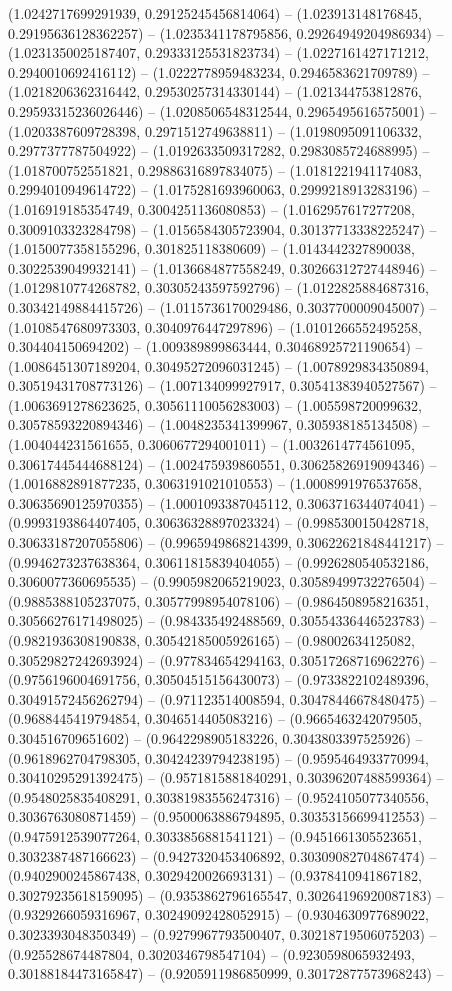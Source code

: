 (1.0242717699291939, 0.29125245456814064) -- (1.023913148176845, 0.29195636128362257) -- (1.0235341178795856, 0.29264949204986934) -- (1.0231350025187407, 0.29333125531823734) -- (1.0227161427171212, 0.2940010692416112) -- (1.0222778959483234, 0.2946583621709789) -- (1.0218206362316442, 0.29530257314330144) -- (1.021344753812876, 0.29593315236026446) -- (1.0208506548312544, 0.2965495616575001) -- (1.0203387609728398, 0.2971512749638811) -- (1.0198095091106332, 0.2977377787504922) -- (1.0192633509317282, 0.2983085724688995) -- (1.018700752551821, 0.29886316897834075) -- (1.0181221941174083, 0.2994010949614722) -- (1.0175281693960063, 0.2999218913283196) -- (1.016919185354749, 0.3004251136080853) -- (1.0162957617277208, 0.3009103323284798) -- (1.0156584305723904, 0.30137713338225247) -- (1.0150077358155296, 0.301825118380609) -- (1.0143442327890038, 0.3022539049932141) -- (1.0136684877558249, 0.30266312727448946) -- (1.0129810774268782, 0.30305243597592796) -- (1.0122825884687316, 0.30342149884415726) -- (1.0115736170029486, 0.3037700009045007) -- (1.0108547680973303, 0.3040976447297896) -- (1.0101266552495258, 0.304404150694202) -- (1.009389899863444, 0.30468925721190654) -- (1.0086451307189204, 0.30495272096031245) -- (1.0078929834350894, 0.30519431708773126) -- (1.007134099927917, 0.30541383940527567) -- (1.0063691278623625, 0.30561110056283003) -- (1.005598720099632, 0.30578593220894346) -- (1.0048235341399967, 0.305938185134508) -- (1.004044231561655, 0.3060677294001011) -- (1.0032614774561095, 0.30617445444688124) -- (1.002475939860551, 0.30625826919094346) -- (1.0016882891877235, 0.3063191021010553) -- (1.0008991976537658, 0.30635690125970355) -- (1.0001093387045112, 0.3063716344074041) -- (0.9993193864407405, 0.30636328897023324) -- (0.9985300150428718, 0.30633187207055806) -- (0.9965949868214399, 0.30622621848441217) -- (0.9946273237638364, 0.30611815839404055) -- (0.9926280540532186, 0.3060077360695535) -- (0.9905982065219023, 0.30589499732276504) -- (0.9885388105237075, 0.30577998954078106) -- (0.9864508958216351, 0.30566276171498025) -- (0.984335492488569, 0.30554336446523783) -- (0.9821936308190838, 0.30542185005926165) -- (0.98002634125082, 0.30529827242693924) -- (0.977834654294163, 0.30517268716962276) -- (0.9756196004691756, 0.30504515156430073) -- (0.9733822102489396, 0.30491572456262794) -- (0.971123514008594, 0.30478446678480475) -- (0.9688445419794854, 0.3046514405083216) -- (0.9665463242079505, 0.304516709651602) -- (0.9642298905183226, 0.3043803397525926) -- (0.9618962704798305, 0.30424239794238195) -- (0.9595464933770994, 0.30410295291392475) -- (0.9571815881840291, 0.30396207488599364) -- (0.9548025835408291, 0.30381983556247316) -- (0.9524105077340556, 0.3036763080871459) -- (0.9500063886794895, 0.30353156699412553) -- (0.9475912539077264, 0.3033856881541121) -- (0.9451661305523651, 0.3032387487166623) -- (0.9427320453406892, 0.30309082704867474) -- (0.9402900245867438, 0.3029420026693131) -- (0.9378410941867182, 0.30279235618159095) -- (0.9353862796165547, 0.30264196920087183) -- (0.9329266059316967, 0.30249092428052915) -- (0.9304630977689022, 0.3023393048350349) -- (0.9279967793500407, 0.30218719506075203) -- (0.925528674487804, 0.3020346798547104) -- (0.9230598065932493, 0.30188184473165847) -- (0.9205911986850999, 0.30172877573968243) -- 